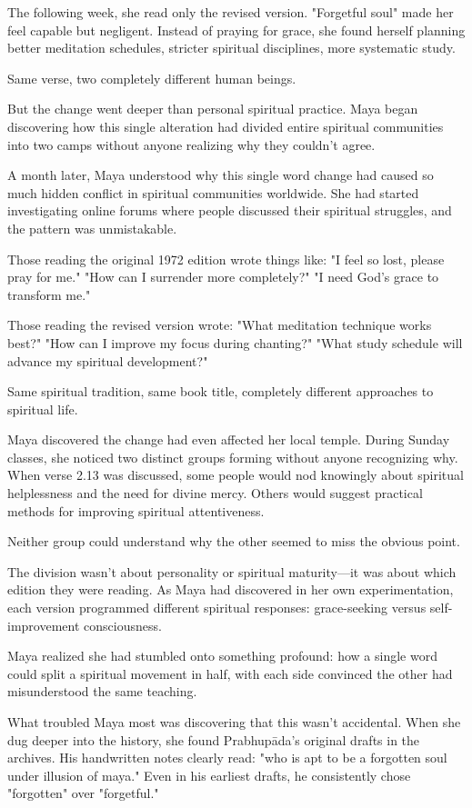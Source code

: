 \documentclass[11pt,twoside]{book}
\begin{document}
The following week, she read only the revised version. "Forgetful soul" made her feel capable but negligent. Instead of praying for grace, she found herself planning better meditation schedules, stricter spiritual disciplines, more systematic study.

Same verse, two completely different human beings.

But the change went deeper than personal spiritual practice. Maya began discovering how this single alteration had divided entire spiritual communities into two camps without anyone realizing why they couldn't agree.

A month later, Maya understood why this single word change had caused so much hidden conflict in spiritual communities worldwide. She had started investigating online forums where people discussed their spiritual struggles, and the pattern was unmistakable.

Those reading the original 1972 edition wrote things like: "I feel so lost, please pray for me." "How can I surrender more completely?" "I need God's grace to transform me."

Those reading the revised version wrote: "What meditation technique works best?" "How can I improve my focus during chanting?" "What study schedule will advance my spiritual development?"

Same spiritual tradition, same book title, completely different approaches to spiritual life.

Maya discovered the change had even affected her local temple. During Sunday classes, she noticed two distinct groups forming without anyone recognizing why. When verse 2.13 was discussed, some people would nod knowingly about spiritual helplessness and the need for divine mercy. Others would suggest practical methods for improving spiritual attentiveness.

Neither group could understand why the other seemed to miss the obvious point.

The division wasn't about personality or spiritual maturity—it was about which edition they were reading. As Maya had discovered in her own experimentation, each version programmed different spiritual responses: grace-seeking versus self-improvement consciousness.

Maya realized she had stumbled onto something profound: how a single word could split a spiritual movement in half, with each side convinced the other had misunderstood the same teaching.

What troubled Maya most was discovering that this wasn't accidental. When she dug deeper into the history, she found Prabhupāda's original drafts in the archives. His handwritten notes clearly read: "who is apt to be a forgotten soul under illusion of maya." Even in his earliest drafts, he consistently chose "forgotten" over "forgetful."
\end{document}

